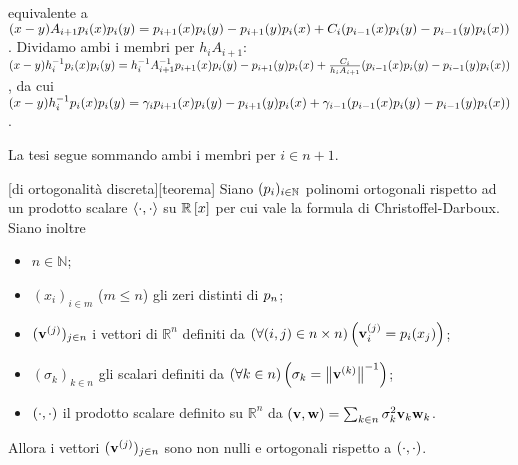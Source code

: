 equivalente a
$(x - y)A_{i + 1}p_i(x)p_i(y) = p_{i + 1}(x)p_i(y) - p_{i + 1}(y)p_i(x) + C_i(p_{i - 1}(x)p_i(y) - p_{i - 1}(y)p_i(x))$.
Dividamo ambi i membri per $h_iA_{i + 1}$:
$(x - y)h_i^{-1}p_i(x)p_i(y) = h_i^{-1}A_{i + 1}^{-1} p_{i + 1}(x)p_i(y) - p_{i + 1}(y)p_i(x) + \frac{C_i}{h_iA_{i + 1}}(p_{i - 1}(x)p_i(y) - p_{i - 1}(y)p_i(x))$,
da cui
$(x - y)h_i^{-1}p_i(x)p_i(y) = \gamma_ip_{i + 1}(x)p_i(y) - p_{i + 1}(y)p_i(x) + \gamma_{i - 1}(p_{i - 1}(x)p_i(y) - p_{i - 1}(y)p_i(x))$.
\par La tesi segue sommando ambi i membri per $i \in n + 1$. \EndProof
\begin{Theorem}
	\label{IstituzioniDiAnalisiNumerica_TeoremaDiOrtogonalitaDiscreta1}
	[di ortogonalit\`a discreta][teorema] Siano $(p_i)_{i \in \mathbb{N}}$ polinomi ortogonali rispetto ad un prodotto scalare $\left \langle \cdot , \cdot \right \rangle$ su $\mathbb{R} \left [ x \right ]$ per cui vale la formula di Christoffel-Darboux. Siano inoltre
	\begin{itemize}
		\item $n \in \mathbb{N}$;
		\item $(x_i)_{i \in m}$ ($m \leq n$) gli zeri distinti di $p_n$;
		\item $(\mathbf{v}^{(j)})_{j \in n}$ i vettori di $\mathbb{R}^n$ definiti da $\left ( \forall (i,j) \in n \times n \right ) \left ( \mathbf{v}^{(j)}_i = p_i(x_j) \right )$;
		\item $(\sigma_k)_{k \in n}$ gli scalari definiti da $\ForAll{k \in n}{\sigma_k = \Norm{\Vector^{(k)}}^{-1}}$;
		\item $\left ( \cdot , \cdot \right )$ il prodotto scalare definito su $\mathbb{R}^n$ da $\left ( \mathbf{v} , \mathbf{w} \right ) = \sum_{k \in n} \sigma_k^2\mathbf{v}_k\mathbf{w}_k$.
	\end{itemize}
	Allora i vettori $(\mathbf{v}^{(j)})_{j \in n}$ sono non nulli e ortogonali rispetto a $\left ( \cdot , \cdot \right )$.
\end{Theorem}

